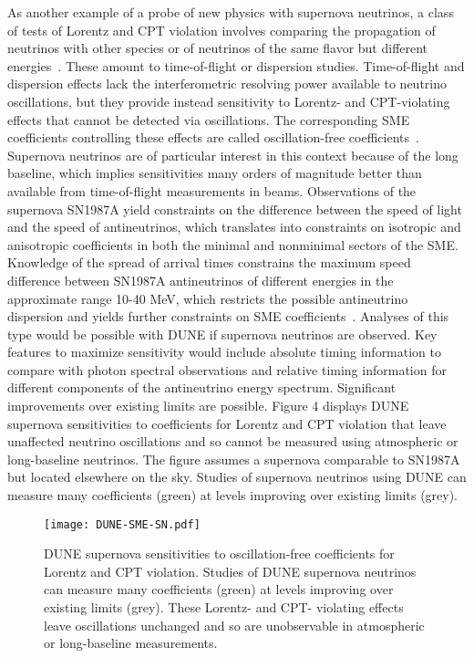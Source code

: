 As another example of a probe of new physics with supernova neutrinos,
a class of tests of Lorentz and CPT violation involves comparing the propagation of neutrinos with other species or of neutrinos of the same flavor but different energies~\cite{Kostelecky:2003cr,Kostelecky:2003xn,Kostelecky:2011gq,Diaz:2009qk}. These amount to time-of-flight or dispersion studies.
Time-of-flight and dispersion effects lack the interferometric resolving power available to neutrino oscillations, but they provide instead sensitivity to Lorentz- and CPT-violating effects that cannot be detected via oscillations. The corresponding SME coefficients controlling these effects are called oscillation-free coefficients~\cite{Kostelecky:2011gq}.
Supernova neutrinos are of particular interest in this context because of the long baseline, which implies sensitivities many orders of magnitude better than available from time-of-flight measurements in beams. Observations of the supernova SN1987A yield constraints on the difference between the speed of light and the speed of antineutrinos, which translates into constraints on isotropic and anisotropic coefficients in both the minimal and nonminimal sectors of the SME. Knowledge of the spread of arrival times constrains the maximum speed difference between SN1987A antineutrinos of different energies in the approximate range 10-40 MeV, which restricts the possible antineutrino dispersion and yields further constraints on SME coefficients~\cite{Kostelecky:2011gq}.
Analyses of this type would be possible with DUNE if supernova neutrinos are observed. Key features to maximize sensitivity would include absolute timing information to compare with photon spectral observations and relative timing information for different components of the antineutrino energy spectrum. Significant improvements over existing limits are possible.
Figure 4 displays DUNE supernova sensitivities to coefficients for Lorentz and CPT violation that leave unaffected neutrino oscillations and so cannot be measured using atmospheric or long-baseline neutrinos. The figure assumes a supernova comparable to SN1987A but located elsewhere on the sky. Studies of supernova neutrinos using DUNE can measure many coefficients (green) at levels improving over existing limits (grey).

\begin{figure}[!htb]
\centering
\texttt{[image: DUNE-SME-SN.pdf]}
\caption{DUNE supernova sensitivities to oscillation-free coefficients for Lorentz and CPT violation. Studies of DUNE supernova neutrinos can measure many coefficients (green) at levels improving over existing limits (grey). These Lorentz- and CPT- violating effects leave oscillations unchanged and so are unobservable in atmospheric or long-baseline measurements.}
\label{fig:snliv}
\end{figure}


